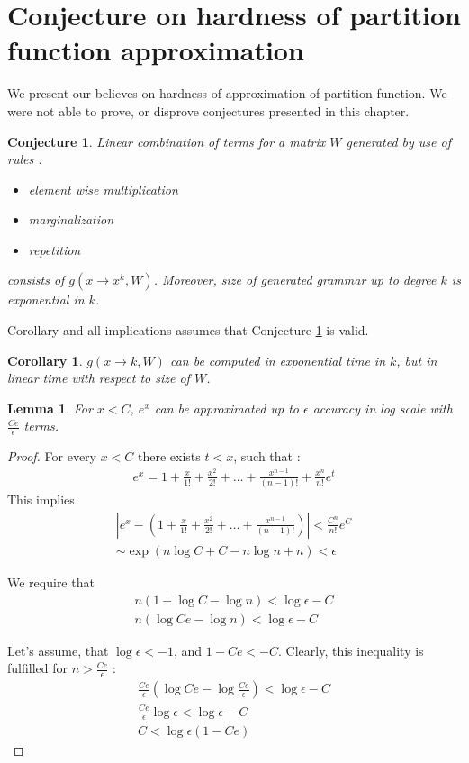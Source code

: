\documentclass{article}
\newtheorem{lemma}[theorem]{Lemma}
\newtheorem{conjecture}[theorem]{Conjecture}
\newtheorem{corollary}[theorem]{Corollary}
\begin{document}
\section{Conjecture on hardness of partition function approximation}

We present our believes on hardness of approximation of partition function. 
We were not able to prove, or disprove conjectures presented in this chapter.

\begin{conjecture}
Linear combination of terms for a matrix $W$ generated by use of rules :
\begin{itemize}
	\item element wise multiplication
	\item marginalization
	\item repetition
\end{itemize}
consists of $g(x \rightarrow x^k, W)$. Moreover, size of generated grammar
up to degree $k$ is exponential in $k$.
\label{simple}
\end{conjecture}

Corollary and all implications assumes that Conjecture \ref{simple} is valid.

\begin{corollary}
	$g(x \rightarrow k, W)$
	can be computed in exponential time in $k$, but in linear time with respect to size of $W$.
\end{corollary}

\begin{lemma}
	For $x < C$, $e^x$ can be approximated up to $\epsilon$ accuracy in log scale with $\frac{Ce}{\epsilon}$ terms. 
\end{lemma}
\begin{proof}

For every $x < C$ there exists $t < x$, such that :  
\begin{align*}
	e^x = 1 + \frac{x}{1!} + \frac{x^2}{2!} + \dots + \frac{x^{n - 1}}{(n - 1)!} + \frac{x^n}{n!}e^t
\end{align*}
This implies
\begin{align*}
	|e^x - (1 + \frac{x}{1!} + \frac{x^2}{2!} + \dots + \frac{x^{n - 1}}{(n - 1)!}) | < \frac{C^n}{n!}e^C \\
	\sim \exp(n\log{C} + C - n\log{n} + n) < \epsilon
\end{align*}

We require that 
\begin{align*}
	n (1 + \log{C} - \log{n}) < \log{\epsilon} - C \\ 
	n (\log{Ce} - \log{n}) < \log{\epsilon} - C
\end{align*}

Let's assume, that $\log{\epsilon} < -1$, and $1 - Ce < -C$. 
Clearly, this inequality is fulfilled for $n > \frac{Ce}{\epsilon}$ :
\begin{align*}
	\frac{Ce}{\epsilon} (\log{Ce} - \log{\frac{Ce}{\epsilon}}) < \log{\epsilon} - C \\
	\frac{Ce}{\epsilon} \log{\epsilon} < \log{\epsilon} - C\\
	C < \log{\epsilon}(1 - Ce)
\end{align*}


\end{proof}
\end{document}
